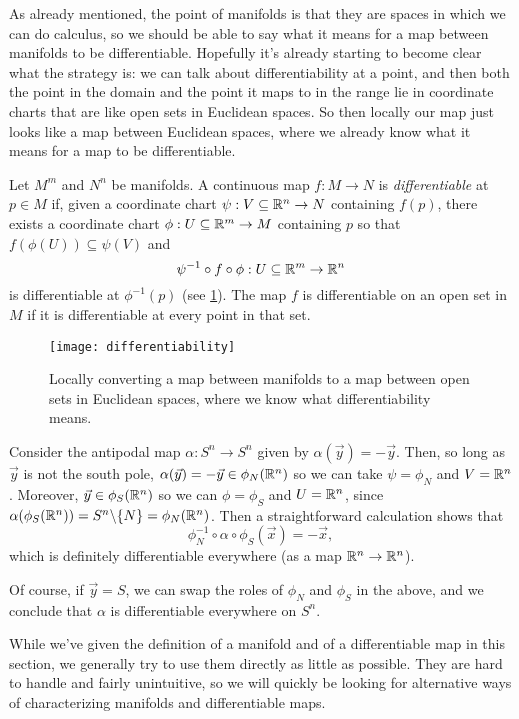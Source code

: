 As already mentioned, the point of manifolds is that they are spaces in which we can do calculus, so we should be able to say what it means for a map between manifolds to be differentiable. Hopefully it's already starting to become clear what the strategy is: we can talk about differentiability at a point, and then both the point in the domain and the point it maps to in the range lie in coordinate charts that are like open sets in Euclidean spaces. So then locally our map just looks like a map between Euclidean spaces, where we already know what it means for a map to be differentiable.

\begin{definition}\label{def:differentiable}
	Let $M^m$ and $N^n$ be manifolds. A continuous map $f: M \to N$ is \emph{differentiable} at $p \in M$ if, given a coordinate chart $\psi: V \subseteq \mathbb{R}^n \to N$ containing $f(p)$, there exists a coordinate chart $\phi: U \subseteq \mathbb{R}^m \to M$ containing $p$ so that $f(\phi(U)) \subseteq \psi(V)$ and 
	\[
		\psi^{-1} \circ f \circ \phi: U \subseteq \mathbb{R}^m \to \mathbb{R}^n
	\]
	is differentiable at $\phi^{-1}(p)$ (see \cref{fig:differentiable}). The map $f$ is differentiable on an open set in $M$ if it is differentiable at every point in that set.
\end{definition}

\begin{figure}[htbp]
	\centering
		\texttt{[image: differentiability]}
	\caption{Locally converting a map between manifolds to a map between open sets in Euclidean spaces, where we know what differentiability means.}
	\label{fig:differentiable}
\end{figure}

\begin{example}
	Consider the antipodal map $\alpha : S^n \to S^n$ given by $\alpha(\vec{y}) = -\vec{y}$. Then, so long as $\vec{y}$ is not the south pole, $\alpha(\vec{y}) = -\vec{y} \in \phi_N(\mathbb{R}^n)$ so we can take $\psi = \phi_N$ and $V = \mathbb{R}^n$. Moreover, $\vec{y} \in \phi_S(\mathbb{R}^n)$ so we can $\phi = \phi_S$ and $U = \mathbb{R}^n$, since $\alpha(\phi_S(\mathbb{R}^n)) = S^n \backslash\{N\} = \phi_N(\mathbb{R}^n)$. Then a straightforward calculation shows that
	\[
		\phi_N^{-1} \circ \alpha \circ \phi_S(\vec{x}) = -\vec{x},
	\]
	which is definitely differentiable everywhere (as a map $\mathbb{R}^n \to \mathbb{R}^n$). 
	
	Of course, if $\vec{y} = S$, we can swap the roles of $\phi_N$ and $\phi_S$ in the above, and we conclude that $\alpha$ is differentiable everywhere on $S^n$.
\end{example}

While we've given the definition of a manifold and of a differentiable map in this section, we generally try to use them directly as little as possible. They are hard to handle and fairly unintuitive, so we will quickly be looking for alternative ways of characterizing manifolds and differentiable maps.
